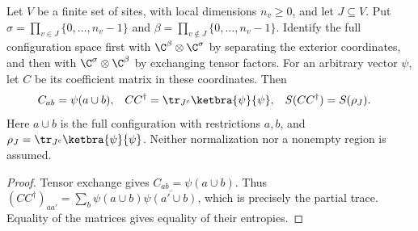 \begin{theorem}
    \label{thm:actual_region_split_entropy}
    \leanok
    Let $V$ be a finite set of sites, with local dimensions $n_v\ge0$,
    and let $J\subseteq V$.
    Put $\sigma=\prod_{v\in J}\{0,\ldots,n_v-1\}$ and
    $\beta=\prod_{v\notin J}\{0,\ldots,n_v-1\}$.
    Identify the full configuration space first with
    $\C^\beta\otimes\C^\sigma$ by separating the exterior coordinates,
    and then with $\C^\sigma\otimes\C^\beta$ by exchanging tensor factors.
    For an arbitrary vector $\psi$, let $C$ be its coefficient matrix in
    these coordinates. Then
    \begin{align}
        C_{ab}&=\psi(a\cup b), &
        CC^\dagger&=\tr_{J^c}\ketbra{\psi}{\psi}, &
        S(CC^\dagger)&=S(\rho_J).
        \label{eq:actual_region_split_entropy}
    \end{align}
    Here $a\cup b$ is the full configuration with restrictions $a,b$, and
    $\rho_J=\tr_{J^c}\ketbra{\psi}{\psi}$.
    Neither normalization nor a nonempty region is assumed.
\end{theorem}
\begin{proof}
    \leanok
    Tensor exchange gives $C_{ab}=\psi(a\cup b)$.
    Thus $(CC^\dagger)_{aa'}=\sum_b\psi(a\cup b)\overline{\psi(a'\cup b)}$,
    which is precisely the partial trace. Equality of the matrices gives
    equality of their entropies.
\end{proof}
